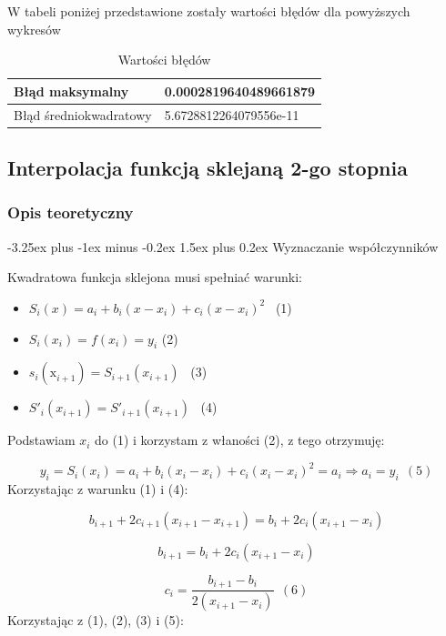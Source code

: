 \documentclass{article}
\makeatletter
\renewcommand{\paragraph}{\@startsection{paragraph}{4}{0ex}%
   {-3.25ex plus -1ex minus -0.2ex}%
   {1.5ex plus 0.2ex}%
   {\normalfont\normalsize\bfseries}}
\makeatother
\begin{document}
W tabeli poniżej przedstawione zostały wartości błędów dla powyższych wykresów

\begin{table}[!ht]
    \centering
    \begin{tabular}{|l|l|}
    \hline
        Błąd maksymalny & 0.0002819640489661879 \\ \hline
        Błąd średniokwadratowy & 5.6728812264079556e-11 \\ \hline
    \end{tabular}
    \caption{Wartości błędów}
\end{table}

\newpage

\subsection{Interpolacja funkcją sklejaną 2-go stopnia}

\subsubsection{Opis teoretyczny}

\paragraph{Wyznaczanie współczynników}
\bigbreak

Kwadratowa funkcja sklejona musi spełniać warunki:

\begin{itemize}
    \item \( S_i (x) = a_i + b_i(x - x_i) + c_i(x - x_i)^2\) \ (1)
    \item \(S_i(x_i) = f(x_i) = y_i\) (2)
    \item \(s_i(\mathrm{x}_{i+1}^{}) = S_{i + 1}(x_{i+1})\) \ (3)
    \item \(S'_i(x_{i+1}) = S'_{i+1}(x_{i+1})\) \ (4)
\end{itemize}

\noindent
Podstawiam \(x_i\) do (1) i korzystam z właności (2), z tego otrzymuję:

\[y_i = S_i (x_i) = a_i + b_i(x_i - x_i) + c_i(x_i - x_i)^2 = a_i \Rightarrow  a_i = y_i \ \ (5)\] 
\noindent
Korzystając z warunku (1) i (4):

\[b_{i+1} + 2c_{i+1}(x_{i+1}-x_{i+1}) = b_i + 2c_i(x_{i+1} - x_i)\]

\[b_{i+1} = b_i + 2c_i(x_{i+1} - x_i)\]

\[c_i = \frac{b_{i+1}-b_i}{2(x_{i+1}-x_i)} \ \ (6)\] 
\noindent
Korzystając z (1), (2), (3) i (5):
\end{document}
